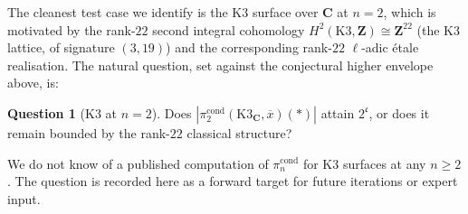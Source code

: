 \documentclass[11pt]{article}
\theoremstyle{definition}
\newtheorem*{question}{Question}
\theoremstyle{plain}
\theoremstyle{remark}
\newcommand{\C}{\mathbf{C}}
\newcommand{\continuum}{\mathfrak{c}}
\begin{document}
The cleanest test case we identify is the K3 surface over $\C$ at $n=2$,
which is motivated by the rank-$22$ second integral cohomology
$H^2(\mathrm{K3}, \mathbf{Z}) \cong \mathbf{Z}^{22}$ (the K3 lattice, of
signature $(3,19)$) and the corresponding rank-$22$ $\ell$-adic \'etale
realisation. The natural question, set against the conjectural higher
envelope above, is:

\begin{question}[K3 at $n=2$]
Does $|\pi_2^{\mathrm{cond}}(\mathrm{K3}_{\C}, \overline{x})(\ast)|$ attain
$2^{\continuum}$, or does it remain bounded by the rank-$22$ classical
structure?
\end{question}

We do not know of a published computation of $\pi_n^{\mathrm{cond}}$ for K3
surfaces at any $n \ge 2$. The question is recorded here as a forward target
for future iterations or expert input.



\end{document}
